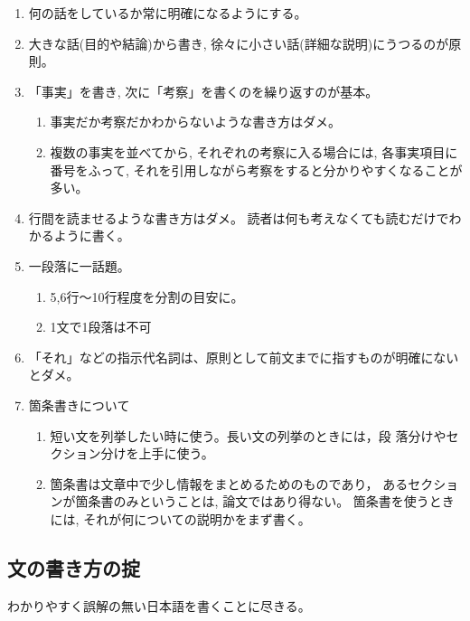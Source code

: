 \documentclass[12pt, ]{jsarticle}
\providecommand{\tightlist}{%
   \setlength{\itemsep}{0pt}\setlength{\parskip}{0pt}}
\begin{document}
\begin{enumerate}
\tightlist
\item
  何の話をしているか常に明確になるようにする。
\item
  大きな話(目的や結論)から書き,
  徐々に小さい話(詳細な説明)にうつるのが原則。
\item
  「事実」を書き, 次に「考察」を書くのを繰り返すのが基本。

  \begin{enumerate}
  \tightlist
  \item
    事実だか考察だかわからないような書き方はダメ。
  \item
    複数の事実を並べてから, それぞれの考察に入る場合には,
    各事実項目に番号をふって,
    それを引用しながら考察をすると分かりやすくなることが多い。
  \end{enumerate}
\item
  行間を読ませるような書き方はダメ。
  読者は何も考えなくても読むだけでわかるように書く。
\item
  一段落に一話題。

  \begin{enumerate}
  \tightlist
  \item
    5,6行〜10行程度を分割の目安に。
  \item
    1文で1段落は不可
  \end{enumerate}
\item
  「それ」などの指示代名詞は、原則として前文までに指すものが明確にないとダメ。
\item
  箇条書きについて

  \begin{enumerate}
  \tightlist
  \item
    短い文を列挙したい時に使う。長い文の列挙のときには，段
    落分けやセクション分けを上手に使う。
  \item
    箇条書は文章中で少し情報をまとめるためのものであり，
    あるセクションが箇条書のみということは, 論文ではあり得ない。
    箇条書を使うときには, それが何についての説明かをまず書く。
  \end{enumerate}
\end{enumerate}

\subsection{文の書き方の掟}\label{ux6587ux306eux66f8ux304dux65b9ux306eux639f}

わかりやすく誤解の無い日本語を書くことに尽きる。
\end{document}
